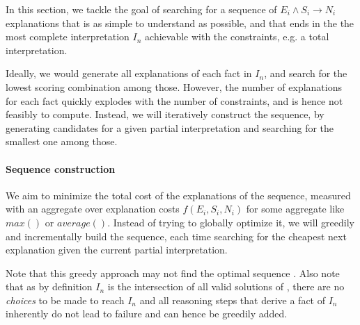 In this section, we tackle the goal of searching for a sequence of $E_i \wedge S_i \rightarrow N_i$ explanations that is as simple to understand as possible, and that ends in the the most complete interpretation $I_n$ achievable with the constraints, e.g. a total interpretation.

Ideally, we would generate all explanations of each fact in $I_n$, and search for the lowest scoring combination among those. However, the number of explanations for each fact quickly explodes with the number of constraints, and is hence not feasibly to compute. Instead, we will iteratively construct the sequence, by generating candidates for a given partial interpretation and searching for the smallest one among those.

\paragraph{Sequence construction}
We aim to minimize the total cost of the explanations of the sequence, measured with an aggregate over explanation costs $f(E_i, S_i, N_i)$ for some aggregate like $max()$ or $average()$. Instead of trying to globally optimize it, we will greedily and incrementally build the sequence, each time searching for the cheapest next explanation given the current partial interpretation. 

Note that this greedy approach may not find the optimal sequence . Also note that as by definition $I_n$ is the intersection of all valid solutions of \allconstraints, there are no \textit{choices} to be made to reach $I_n$ and all reasoning steps that derive a fact of $I_n$ inherently do not lead to failure and can hence be greedily added. 


